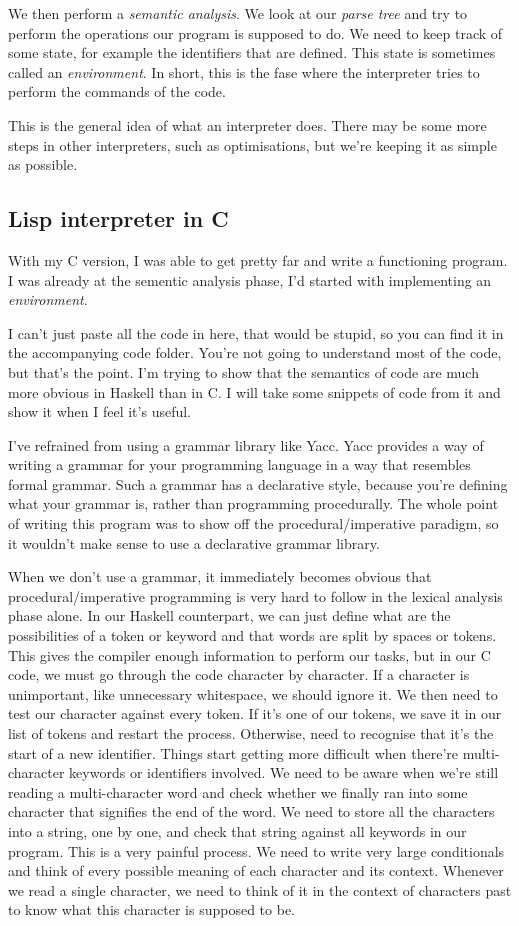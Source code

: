 \documentclass[11pt]{article}
\begin{document}
We then perform a \emph{semantic analysis}. We look at our \emph{parse tree}
and try to perform the operations our program is supposed to do. We need to
keep track of some state, for example the identifiers that are defined. This
state is sometimes called an \emph{environment}. In short, this is the fase
where the interpreter tries to perform the commands of the code.

This is the general idea of what an interpreter does. There may be some more
steps in other interpreters, such as optimisations, but we're keeping it as
simple as possible.

\subsection{Lisp interpreter in C}

With my C version, I was able to get pretty far and write a functioning
program. I was already at the sementic analysis phase, I'd started with
implementing an \emph{environment}.

I can't just paste all the code in here, that would be stupid, so you can find
it in the accompanying code folder. You're not going to understand most of the
code, but that's the point. I'm trying to show that the semantics of code are
much more obvious in Haskell than in C. I will take some snippets of code from
it and show it when I feel it's useful.

I've refrained from using a grammar library like Yacc. Yacc provides a way of
writing a grammar for your programming language in a way that resembles formal
grammar. Such a grammar has a declarative style, because you're defining what
your grammar is, rather than programming procedurally. The whole point of
writing this program was to show off the procedural/imperative paradigm, so it
wouldn't make sense to use a declarative grammar library.

When we don't use a grammar, it immediately becomes obvious that
procedural/imperative programming is very hard to follow in the lexical
analysis phase alone. In our Haskell counterpart, we can just define what are
the possibilities of a token or keyword and that words are split by spaces or
tokens. This gives the compiler enough information to perform our tasks, but in
our C code, we must go through the code character by character. If a character
is unimportant, like unnecessary whitespace, we should ignore it. We then need
to test our character against every token. If it's one of our tokens, we save
it in our list of tokens and restart the process. Otherwise, need to recognise
that it's the start of a new identifier. Things start getting more difficult
when there're multi-character keywords or identifiers involved. We need to be
aware when we're still reading a multi-character word and check whether we
finally ran into some character that signifies the end of the word. We need to
store all the characters into a string, one by one, and check that string
against all keywords in our program. This is a very painful process. We need to
write very large conditionals and think of every possible meaning of each
character and its context. Whenever we read a single character, we need to
think of it in the context of characters past to know what this character is
supposed to be.
\end{document}
